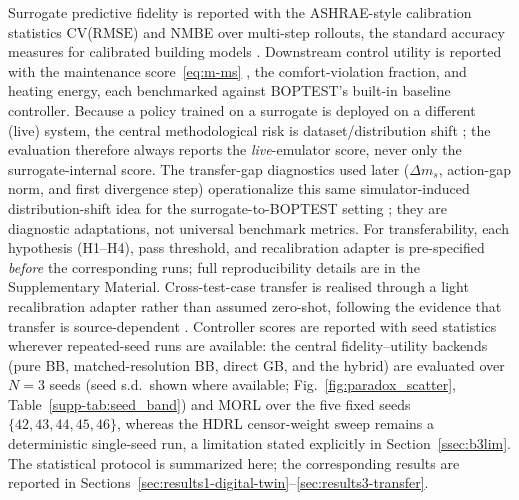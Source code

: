 \documentclass[a4paper,fleqn]{cas-sc}
\newcommand{\RMSE}{\ensuremath{\mathrm{RMSE}}}
\newcommand{\suppref}[1]{\ref{supp-#1}}
\begin{document}
Surrogate predictive fidelity is reported with the ASHRAE-style calibration
statistics CV(\RMSE) and NMBE over multi-step rollouts, the standard accuracy
measures for calibrated building models \citep{Bacher2011RCIdentification}.
Downstream control utility is reported with the maintenance score~\eqref{eq:m-ms}
\citep{Wang2025SafeDRL}, the comfort-violation fraction, and heating energy,
each benchmarked against BOPTEST's built-in baseline controller. Because a policy
trained on a surrogate is deployed on a different (live) system, the central
methodological risk is dataset/distribution shift \citep{Quinonero2009DatasetShift};
the evaluation therefore always reports the \emph{live}-emulator score, never only the
surrogate-internal score. The transfer-gap diagnostics used later ($\Delta m_s$, action-gap norm, and first divergence step) operationalize this same simulator-induced distribution-shift idea for the surrogate-to-BOPTEST setting \citep{Quinonero2009DatasetShift,RiahiSamani2026OOD}; they are diagnostic adaptations, not universal benchmark metrics. For transferability, each hypothesis (H1--H4), pass threshold, and recalibration adapter is pre-specified \emph{before} the corresponding runs; full reproducibility details are in the Supplementary Material. Cross-test-case transfer is realised through a light recalibration adapter
rather than assumed zero-shot, following the evidence that transfer is
source-dependent \citep{Hou2024MultiSource}. Controller scores are reported with
seed statistics wherever repeated-seed runs are available: the central fidelity--utility
backends (pure BB, matched-resolution BB, direct GB, and the hybrid) are evaluated over $N=3$
seeds (seed s.d.\ shown where available; Fig.~\ref{fig:paradox_scatter}, Table~\suppref{tab:seed_band})
and MORL over the five fixed seeds $\{42,43,44,45,46\}$, whereas the HDRL censor-weight
sweep remains a deterministic single-seed run, a limitation stated explicitly in Section~\ref{ssec:b3lim}. The statistical protocol is summarized here; the corresponding results are reported in
Sections~\ref{sec:results1-digital-twin}--\ref{sec:results3-transfer}.
\end{document}
